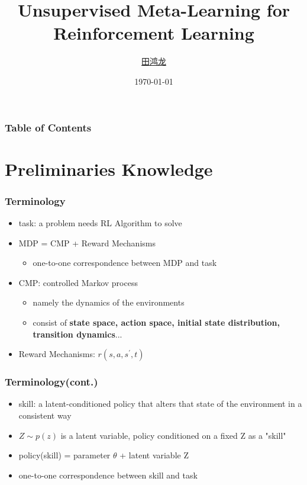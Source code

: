 \documentclass[aspectratio=169]{beamer}
\title{Unsupervised Meta-Learning for Reinforcement Learning}
\author{\href{mailto:}{田鸿龙}}
\institute{LAMDA, Nanjing University}
\date{\today}
\begin{document}
\frame{\titlepage}

\begin{frame}
\frametitle{Table of Contents}
\tableofcontents[hidesubsections]
\end{frame}

\section{Preliminaries Knowledge}
\begin{frame}
  \frametitle{Terminology}
  \begin{itemize}
    \item task: a problem needs RL Algorithm to solve
    \item MDP = CMP + Reward Mechanisms
    \begin{itemize}
      \item one-to-one correspondence between MDP and task
    \end{itemize}
    \item CMP: controlled Markov process
    \begin{itemize}
      \item namely the dynamics of the environments
      \item consist of \textbf{state space, action space, initial state distribution, transition dynamics}...
    \end{itemize}
    \item Reward Mechanisms: $r(s, a, s^\prime, t)$
  \end{itemize}
\end{frame}

\begin{frame}
  \frametitle{Terminology(cont.)}
  \begin{itemize}
    \item skill: a latent-conditioned policy that alters that state of the environment in a consistent way
    \item $Z \sim p(z)$ is a latent variable, policy conditioned on a fixed Z as a "skill"
    \item policy(skill) = parameter $\theta$ + latent variable Z
    \item one-to-one correspondence between skill and task
  \end{itemize}
\end{frame}
\end{document}

